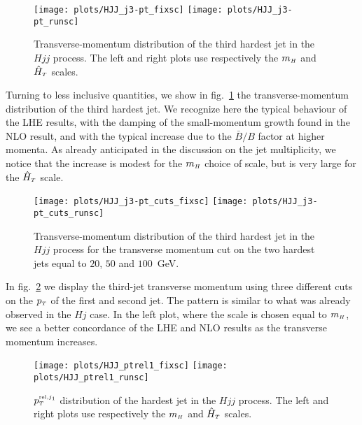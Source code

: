 \documentclass[paper]{JHEP3}
\newlength{\hfig}
\newlength{\hfigs}
\newcommand\mH{m_{\sss  H}}
\newcommand\HThat{\hat{H}_{\sss  T}}
\newcommand\ptrelone{p_{\sss T}^{\sss {\rm rel},j_1}}
\newcommand\sss{\mathchoice%
{\displaystyle}%
{\scriptstyle}%
{\scriptscriptstyle}%
{\scriptscriptstyle}%
}
\newcommand\pT{p_{\sss T}}
\begin{document}
\begin{figure}[htb]
\begin{center}
\texttt{[image: plots/HJJ\_j3-pt\_fixsc]}  \nolinebreak
\texttt{[image: plots/HJJ\_j3-pt\_runsc]} 
\caption{Transverse-momentum distribution of the third hardest jet in the
  $Hjj$ process. The left and right plots use respectively the $\mH$ and
  $\HThat$ scales.}
\label{fig:HJJ_j3-pt}
\end{center}
\end{figure}
Turning to less inclusive quantities, we show in fig.~\ref{fig:HJJ_j3-pt} the
transverse-momentum distribution of the third hardest jet.  We recognize here
the typical behaviour of the LHE results, with the damping of the
small-momentum growth found in the NLO result, and with the typical increase
due to the $\bar{B}/B$ factor at higher momenta.  As already anticipated in
the discussion on the jet multiplicity, we notice that the increase is
modest for the $\mH$ choice of scale, but is very large for the
$\HThat$ scale.

\begin{figure}[htb]
\begin{center}
\texttt{[image: plots/HJJ\_j3-pt\_cuts\_fixsc]}\nolinebreak  
\texttt{[image: plots/HJJ\_j3-pt\_cuts\_runsc]} 
\caption{Transverse-momentum distribution of the third hardest jet in the
  $Hjj$ process for the transverse momentum cut on the two hardest jets equal
  to $20$, $50$ and $100$~GeV.}
\label{fig:HJJ_j3-pt_cuts}
\end{center}
\end{figure}
In fig.~\ref{fig:HJJ_j3-pt_cuts} we display the third-jet transverse momentum
using three different cuts on the $\pT$ of the first and second jet. The
pattern is similar to what was already observed in the $Hj$ case. In the left
plot, where the scale is chosen equal to $\mH$, we see a better concordance
of the LHE and NLO results as the transverse momentum increases.

\begin{figure}[htb]
\begin{center}
\texttt{[image: plots/HJJ\_ptrel1\_fixsc]} \nolinebreak
\texttt{[image: plots/HJJ\_ptrel1\_runsc]} 
\caption{$\ptrelone$ distribution of the hardest jet in the $Hjj$
  process. The left and right plots use respectively the $\mH$ and $\HThat$
  scales.}
\label{fig:HJJ_ptrel1}
\end{center}
\end{figure}
\end{document}
